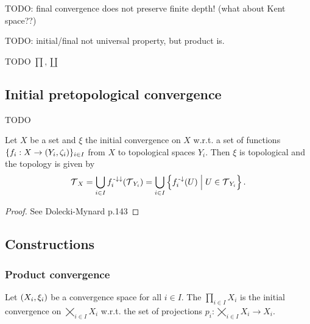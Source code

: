 TODO: final convergence does not preserve finite depth! (what about Kent space??)

TODO: initial/final not universal property, but product is.

TODO $\prod, \coprod$

\subsection{Initial pretopological convergence}
TODO

\begin{proposition} \label{topologicalInitialFinalConvergence}
Let $X$ be a set and $\xi$ the initial convergence on $X$ w.r.t. a set of functions $\{f_i: X\to \left( Y_i, \zeta_i \right)\}_{i\in I}$ from $X$ to topological spaces $Y_i$. Then $\xi$ is topological and the topology is given by
\[ \operatorname{\mathcal{T}}_X = \bigcup_{i\in I} f_i^{{\text{\hspace{0.15em}-}\downarrow}\downarrow}(\operatorname{\mathcal{T}}_{Y_i}) = \bigcup_{i\in I}\left\{ f_i^{{\text{\hspace{0.15em}-}\downarrow}}(U) \;\middle|\; U\in \operatorname{\mathcal{T}}_{Y_i} \right\}. \]
\end{proposition}
\begin{proof}
See Dolecki-Mynard p.143
\end{proof}

\subsection{Constructions}
\subsubsection{Product convergence}
\begin{definition}
Let $\left( X_i, \xi_i \right)$ be a convergence space for all $i\in I$. The  $\prod_{i\in I}X_i$ is the initial convergence on $\bigtimes_{i\in I}X_i$ w.r.t. the set of projections $p_i: \bigtimes_{i\in I}X_i \to X_i$.
\end{definition}

